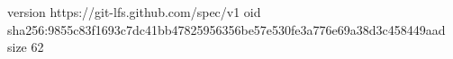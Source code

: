 version https://git-lfs.github.com/spec/v1
oid sha256:9855c83f1693c7dc41bb47825956356be57e530fe3a776e69a38d3c458449aad
size 62
